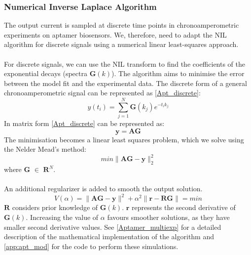 \subsubsection{Numerical Inverse Laplace Algorithm}
The output current is sampled at discrete time points in chronoamperometric experiments on aptamer biosensors. We, therefore, need to adapt the NIL algorithm for discrete signals using a numerical linear least-squares approach.\\\\
For discrete signals, we can use the NIL transform to find the coefficients of the exponential decays (spectra $\mathbf{G}(k)$).
The algorithm aims to minimise the error between the model fit and the experimental data.
The discrete form of a general chronoamperometric signal can be represented as \autoref{Apt_discrete}:
\begin{equation}
    y(t_{i}) = \sum_{j=1}^{N} \mathbf{G}(k_{j})e^{-t_{i}k_{j}}
    \label{Apt_discrete}
\end{equation}
In matrix form \autoref{Apt_discrete} can be represented as:
$$ \mathbf{y = AG} $$
The minimisation becomes a linear least squares problem, which we solve using the Nelder Mead's method:
\begin{equation}
    min\lVert \mathbf{AG} - \mathbf{y}\lVert^{2}_{2}
    \label{discretething}
\end{equation}
where $\mathbf{G}$ $\in$ $\mathbf{R}^{N}$.\\\\
An additional regularizer is added to smooth the output solution.
\begin{equation}
    V(\alpha) = \lVert \mathbf{AG} - \mathbf{y}\lVert^{2}+\alpha^{2}\lVert \mathbf{r} - \mathbf{RG}\lVert  = min
\end{equation}
$\mathbf{R}$ considers prior knowledge of $\mathbf{G}(k)$. $\mathbf{r}$ represents the second derivative of $\mathbf{G}(k)$. Increasing the value of $\alpha$ favours smoother solutions, as they have smaller second derivative values. See \autoref{Aptamer_multiexp} for a detailed description of the mathematical implementation of the algorithm and \autoref{app:apt_mod} for the code to perform these simulations.\\\\
